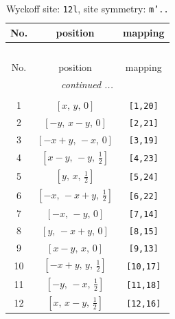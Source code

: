 \documentclass[fleqn,8pt]{jsarticle}
\begin{document}
\begin{longtable}{ccc}
\caption{Wyckoff site: {\tt 12l}, site symmetry: {\tt m'..}}
 \\
 \hline \hline
No. & position & mapping \\ \hline \endfirsthead

\multicolumn{2}{l}{\tablename\ \thetable{}} \\
 \hline \hline
No. & position & mapping \\ \hline \endhead

 \hline \hline
\multicolumn{2}{r}{\footnotesize\it continued ...} \\ \endfoot

 \hline \hline
\multicolumn{2}{r}{} \\ \endlastfoot

1 & $\left[ x,\, y,\, 0 \right]$ & {\tt [1,20]} \\ \hline
2 & $\left[ - y,\, x - y,\, 0 \right]$ & {\tt [2,21]} \\ \hline
3 & $\left[ - x + y,\, - x,\, 0 \right]$ & {\tt [3,19]} \\ \hline
4 & $\left[ x - y,\, - y,\, \frac{1}{2} \right]$ & {\tt [4,23]} \\ \hline
5 & $\left[ y,\, x,\, \frac{1}{2} \right]$ & {\tt [5,24]} \\ \hline
6 & $\left[ - x,\, - x + y,\, \frac{1}{2} \right]$ & {\tt [6,22]} \\ \hline
7 & $\left[ - x,\, - y,\, 0 \right]$ & {\tt [7,14]} \\ \hline
8 & $\left[ y,\, - x + y,\, 0 \right]$ & {\tt [8,15]} \\ \hline
9 & $\left[ x - y,\, x,\, 0 \right]$ & {\tt [9,13]} \\ \hline
10 & $\left[ - x + y,\, y,\, \frac{1}{2} \right]$ & {\tt [10,17]} \\ \hline
11 & $\left[ - y,\, - x,\, \frac{1}{2} \right]$ & {\tt [11,18]} \\ \hline
12 & $\left[ x,\, x - y,\, \frac{1}{2} \right]$ & {\tt [12,16]} \\
\end{longtable}
\renewcommand{\arraystretch}{1.2}
\end{document}
